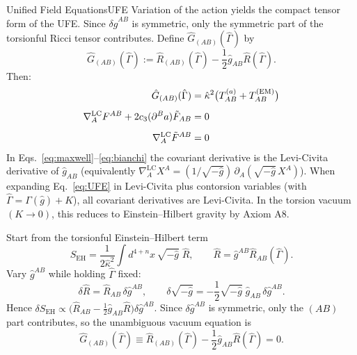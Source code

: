 \begin{theorem}{Unified Field Equations}{UFE}
Variation of the action yields the compact tensor form of the UFE. Since $\delta\hat{g}^{AB}$ is symmetric, only the symmetric part of the torsionful Ricci tensor contributes. Define
$\hat{G}_{(AB)}(\hat{\Gamma})$ by
\begin{equation*}
    \hat{G}_{(AB)}(\hat{\Gamma}) := \hat{R}_{(AB)}(\hat{\Gamma}) - \frac{1}{2}\hat{g}_{AB}\hat{R}(\hat{\Gamma}).
\end{equation*}
Then:
\begin{align}
    \hat{G}_{(AB)}(\hat{\Gamma})
        &= \hat{\kappa}^2\bigl(T^{(a)}_{AB} + T^{(\text{EM})}_{AB}\bigr)
        \label{eq:UFE}\\[0.5em]
    \nabla^{\mathrm{LC}}_A F^{AB} + 2c_3(\partial^B a)\tilde{F}_{AB} &= 0
        \label{eq:maxwell}\\[0.5em]
    \nabla^{\mathrm{LC}}_A\tilde{F}^{AB} &= 0
        \label{eq:bianchi}
\end{align}
In Eqs.~\eqref{eq:maxwell}--\eqref{eq:bianchi} the covariant derivative is the Levi-Civita derivative of $\hat{g}_{AB}$ (equivalently $\nabla^{\mathrm{LC}}_A X^A=(1/\sqrt{-\hat{g}})\,\partial_A(\sqrt{-\hat{g}}\,X^A)$).
When expanding Eq.~\eqref{eq:UFE} in Levi-Civita plus contorsion variables (with $\hat{\Gamma}=\Gamma(\hat{g})+K$), all covariant derivatives are Levi-Civita.
In the torsion vacuum $(K \to 0)$, this reduces to Einstein--Hilbert gravity 
by Axiom A8.
\end{theorem}

\begin{tcolorbox}[colback=gray!5, colframe=gray!60,
title={\textbf{Why the UFE uses the symmetric torsionful Einstein tensor}}, fonttitle=\bfseries\small]
Start from the torsionful Einstein--Hilbert term
\[
S_{\mathrm{EH}}=\frac{1}{2\hat{\kappa}^2}\int d^{4+n}x\,\sqrt{-\hat{g}}\;\hat{R},
\qquad
\hat{R}=\hat{g}^{AB}\hat{R}_{AB}(\hat{\Gamma}).
\]
Vary $\hat{g}^{AB}$ while holding $\hat{\Gamma}$ fixed:
\[
\delta\hat{R}=\hat{R}_{AB}\,\delta\hat{g}^{AB},
\qquad
\delta\sqrt{-\hat{g}}=-\frac12\sqrt{-\hat{g}}\;\hat{g}_{AB}\,\delta\hat{g}^{AB}.
\]
Hence $\delta S_{\mathrm{EH}}\propto\bigl(\hat{R}_{AB}-\tfrac12\hat{g}_{AB}\hat{R}\bigr)\delta\hat{g}^{AB}$.
Since $\delta\hat{g}^{AB}$ is symmetric, only the $(AB)$ part contributes, so the unambiguous vacuum equation is
\[
\hat{G}_{(AB)}(\hat{\Gamma})\equiv \hat{R}_{(AB)}(\hat{\Gamma})-\frac12\hat{g}_{AB}\hat{R}(\hat{\Gamma})=0.
\]
\end{tcolorbox}

